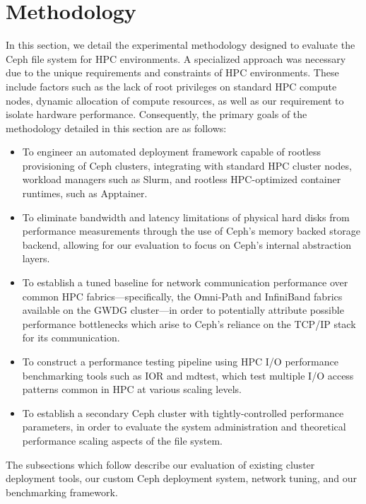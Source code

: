 
\pagebreak
\section{Methodology}
\label{sec:methodology}

In this section, we detail the experimental methodology designed to evaluate the Ceph file system for \ac{HPC} environments. A specialized approach was necessary due to the unique requirements and constraints of \ac{HPC} environments. These include factors such as the lack of root privileges on standard \ac{HPC} compute nodes, dynamic allocation of compute resources, as well as our requirement to isolate hardware performance. Consequently, the primary goals of the methodology detailed in this section are as follows:

\begin{itemize}
    \item To engineer an automated deployment framework capable of rootless provisioning of Ceph clusters, integrating with standard \ac{HPC} cluster nodes, workload managers such as Slurm, and rootless \acs{HPC}-optimized container runtimes, such as Apptainer.
    \item To eliminate bandwidth and latency limitations of physical hard disks from performance measurements through the use of Ceph's memory backed storage backend, allowing for our evaluation to focus on Ceph's internal abstraction layers.
    \item To establish a tuned baseline for network communication performance over common \ac{HPC} fabrics---specifically, the Omni-Path and InfiniBand fabrics available on the \acs{GWDG} cluster---in order to potentially attribute possible performance bottlenecks which arise to Ceph's reliance on the \ac{TCP/IP} stack for its communication.
    \item To construct a performance testing pipeline using \ac{HPC} \acs{I/O} performance benchmarking tools such as \ac{IOR} and mdtest, which test multiple \ac{I/O} access patterns common in \ac{HPC} at various scaling levels.
    \item To establish a secondary Ceph cluster with tightly-controlled performance parameters, in order to evaluate the system administration and theoretical performance scaling aspects of the file system.
\end{itemize}

The subsections which follow describe our evaluation of existing cluster deployment tools, our custom Ceph deployment system, network tuning, and our benchmarking framework.

